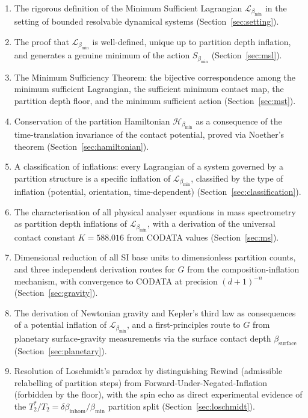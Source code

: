 \documentclass[11pt,twocolumn,a4paper]{article}
\theoremstyle{plain}
\theoremstyle{definition}
\theoremstyle{remark}
\newcommand{\bmin}{\beta_{\min}}
\newcommand{\Lmin}{\mathcal{L}_{\bmin}}
\newcommand{\Smin}{S_{\bmin}}
\newcommand{\Hmin}{\mathcal{H}_{\bmin}}
\begin{document}
\begin{enumerate}[label=(\roman*)]
\item The rigorous definition of the Minimum Sufficient Lagrangian $\Lmin$ in
  the setting of bounded resolvable dynamical systems
  (Section~\ref{sec:setting}).

\item The proof that $\Lmin$ is well-defined, unique up to partition depth
  inflation, and generates a genuine minimum of the action $\Smin$
  (Section~\ref{sec:msl}).

\item The Minimum Sufficiency Theorem: the bijective correspondence among the
  minimum sufficient Lagrangian, the sufficient minimum contact map, the
  partition depth floor, and the minimum sufficient action
  (Section~\ref{sec:mst}).

\item Conservation of the partition Hamiltonian $\Hmin$ as a consequence of
  the time-translation invariance of the contact potential, proved via
  Noether's theorem (Section~\ref{sec:hamiltonian}).

\item A classification of inflations: every Lagrangian of a system governed by
  a partition structure is a specific inflation of $\Lmin$, classified by the
  type of inflation (potential, orientation, time-dependent)
  (Section~\ref{sec:classification}).

\item The characterisation of all physical analyser equations in mass
  spectrometry as partition depth inflations of $\Lmin$, with a derivation of
  the universal contact constant $K = 588.016$ from CODATA values
  (Section~\ref{sec:ms}).

\item Dimensional reduction of all SI base units to dimensionless partition
  counts, and three independent derivation routes for $G$ from the
  composition-inflation mechanism, with convergence to CODATA at precision
  $(d+1)^{-n}$ (Section~\ref{sec:gravity}).

\item The derivation of Newtonian gravity and Kepler's third law as
  consequences of a potential inflation of $\Lmin$, and a first-principles
  route to $G$ from planetary surface-gravity measurements via the surface
  contact depth $\beta_{\mathrm{surface}}$ (Section~\ref{sec:planetary}).

\item Resolution of Loschmidt's paradox by distinguishing Rewind (admissible
  relabelling of partition steps) from Forward-Under-Negated-Inflation
  (forbidden by the floor), with the spin echo as direct experimental evidence
  of the $T_2^*/T_2 = \delta\beta_{\mathrm{inhom}}/\bmin$ partition split
  (Section~\ref{sec:loschmidt}).
\end{enumerate}
\end{document}
